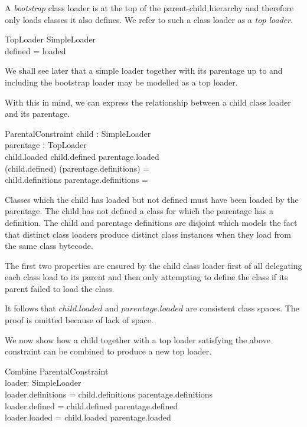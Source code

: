 \documentclass[a4paper,9pt]{article}
\begin{document}
A \textit{bootstrap} class loader is at the top of the
parent-child hierarchy and therefore only loads classes it also defines.
We refer to such a class loader as a \textit{top loader}.
\begin{schema}{TopLoader}
  SimpleLoader \\
\where
  defined = loaded \\
\end{schema}

We shall see later that a simple loader together with its parentage
up to and including the bootstrap loader may be modelled as a
top loader.

With this in mind, we can express the relationship between a child
class loader and its parentage.

\begin{schema}{ParentalConstraint}
  child : SimpleLoader \\
  parentage : TopLoader \\
\where
  child.loaded \setminus child.defined \subseteq parentage.loaded \\
  (\dom child.defined) \cap (\dom parentage.definitions) = \emptyset \\
  child.definitions \cap parentage.definitions = \emptyset \\
\end{schema}
Classes which the child has loaded but not defined must have been
loaded by the parentage.
The child has not defined a class for which the parentage has a
definition.
The child and parentage definitions are disjoint which models the
fact that distinct class loaders produce distinct class
instances when they load from the same class bytecode.

The first two properties are ensured by the child class loader
first of all delegating each class load to its parent and then only
attempting to define the class if its parent failed to load the class.

It follows that $child.loaded$ and $parentage.loaded$ are consistent
class spaces.
The proof is omitted because of lack of space.

We now show how a child together with a top loader satisfying the
above constraint can be combined to produce a new top loader.

\begin{schema}{Combine}
  ParentalConstraint \\
  loader: SimpleLoader \\
\where
  loader.definitions = child.definitions \oplus parentage.definitions \\
  loader.defined = child.defined \cup parentage.defined \\
  loader.loaded = child.loaded \cup parentage.loaded \\
\end{schema}
\end{document}
